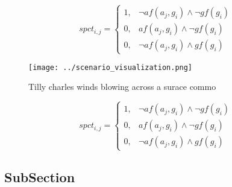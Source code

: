 \documentclass[a4paper]{article}
\begin{document}
\begin{equation}
spct_{i,j} =
\begin{cases}
1, & \text{$\neg af(a_j,g_i) \wedge \neg gf(g_i)$}\\
0, & \text{$af(a_j,g_i) \wedge \neg gf(g_i)$}\\
0, & \text{$\neg af(a_j,g_i) \wedge gf(g_i)$}
\end{cases}
\end{equation}

\begin{figure}
\centering
\texttt{[image: ../scenario\_visualization.png]}
\caption{Tilly charles winds blowing across a surace commo
}
\end{figure}
 
\begin{equation}
spct_{i,j} =
\begin{cases}
1, & \text{$\neg af(a_j,g_i) \wedge \neg gf(g_i)$}\\
0, & \text{$af(a_j,g_i) \wedge \neg gf(g_i)$}\\
0, & \text{$\neg af(a_j,g_i) \wedge gf(g_i)$}
\end{cases}
\end{equation}

\subsection{SubSection}
\end{document}
